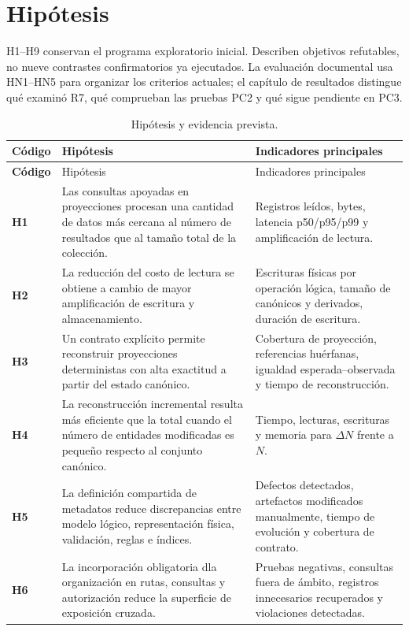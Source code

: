 \section{Hipótesis}

H1--H9 conservan el programa exploratorio inicial. Describen objetivos refutables,
no nueve contrastes confirmatorios ya ejecutados. La evaluación documental usa
HN1--HN5 para organizar los criterios actuales; el capítulo de resultados distingue
qué examinó R7, qué comprueban las pruebas PC2 y qué sigue pendiente en PC3.

\begin{longtable}{>{\bfseries}p{1.6cm}p{5.2cm}p{7.1cm}}
\caption{Hipótesis y evidencia prevista.}\label{tab:hipotesis}\\
\toprule
Código & Hipótesis & Indicadores principales \\
\midrule
\endfirsthead
\toprule
Código & Hipótesis & Indicadores principales \\
\midrule
\endhead
H1 & Las consultas apoyadas en proyecciones procesan una cantidad de datos más cercana
al número de resultados que al tamaño total de la colección. & Registros leídos, bytes,
latencia p50/p95/p99 y amplificación de lectura. \\
H2 & La reducción del costo de lectura se obtiene a cambio de mayor amplificación de
escritura y almacenamiento. & Escrituras físicas por operación lógica, tamaño de
canónicos y derivados, duración de escritura. \\
H3 & Un contrato explícito permite reconstruir proyecciones deterministas con alta
exactitud a partir del estado canónico. & Cobertura de proyección, referencias
huérfanas, igualdad esperada--observada y tiempo de reconstrucción. \\
H4 & La reconstrucción incremental resulta más eficiente que la total cuando el número
de entidades modificadas es pequeño respecto al conjunto canónico. & Tiempo, lecturas,
escrituras y memoria para $\Delta N$ frente a $N$. \\
H5 & La definición compartida de metadatos reduce discrepancias entre modelo lógico,
representación física, validación, reglas e índices. & Defectos detectados, artefactos
modificados manualmente, tiempo de evolución y cobertura de contrato. \\
H6 & La incorporación obligatoria dla organización en rutas, consultas y autorización reduce
la superficie de exposición cruzada. & Pruebas negativas, consultas fuera de ámbito,
registros innecesarios recuperados y violaciones detectadas. \\

\end{longtable}
